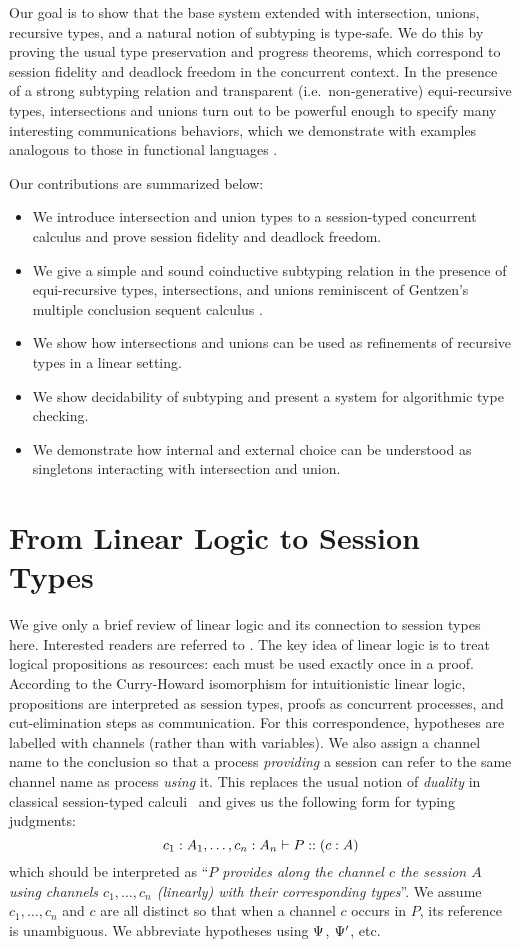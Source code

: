 \documentclass[submission,copyright,creativecommons]{eptcs}
\begin{document}
Our goal is to show that the base system extended with intersection, unions, recursive types, and a natural notion of subtyping is type-safe. We do this by proving the usual type preservation and progress theorems, which correspond to session fidelity and deadlock freedom in the concurrent context. In the presence of a strong subtyping relation and transparent (i.e.\ non-generative)  equi-recursive types, intersections and unions turn out to be powerful enough to specify many interesting communications behaviors, which we demonstrate with examples analogous to those in functional languages \cite{FreemanP91,Dunfield03}.

Our contributions are summarized below:
\begin{itemize}
  \item We introduce intersection and union types to a session-typed concurrent calculus and prove session fidelity and deadlock freedom.
  \item We give a simple and sound coinductive subtyping relation in the presence of equi-recursive types, intersections, and unions reminiscent of Gentzen's multiple conclusion sequent calculus \cite{Gentzen35, Girard87}.
  \item We show how intersections and unions can be used as refinements of recursive types in a linear setting.
  \item We show decidability of subtyping and present a system for algorithmic type checking.
  \item We demonstrate how internal and external choice can be understood as singletons interacting with intersection and union.
\end{itemize}


\section{From Linear Logic to Session Types}
\label{base}
We give only a brief review of linear logic and its connection to session types here. Interested readers are referred to \cite{CairesP10, PfenningG15, Honda93}. The key idea of linear logic is to treat logical propositions as resources: each must be used exactly once in a proof. According to the Curry-Howard isomorphism for intuitionistic linear logic, propositions are interpreted as session types, proofs as concurrent processes, and cut-elimination steps as communication. For this correspondence, hypotheses are labelled with channels (rather than with variables). We also assign a channel name to the conclusion so that a process \emph{providing} a session can refer to the same channel name as process \emph{using} it. This replaces the usual notion of \emph{duality} in classical session-typed calculi~\cite{Honda93} and gives us the following form for typing judgments:
$$ c_1 : A_1, \ldots, c_n : A_n \vdash P :: (c : A)$$
which should be interpreted as ``\emph{$P$ provides along the channel $c$ the session $A$ using channels $c_1, \ldots, c_n$ (linearly) with their corresponding types}''. We assume $c_1, \ldots, c_n$ and $c$ are all distinct so that when a channel $c$ occurs in $P$, its reference is unambiguous.  We abbreviate hypotheses using $\Psi$,
$\Psi'$, etc.
\end{document}
